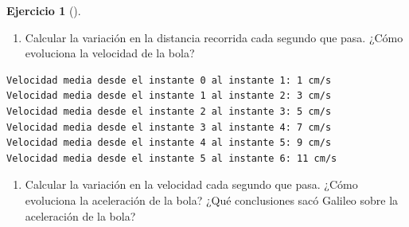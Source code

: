 \documentclass[
  a4paper,
]{scrreport}
\newenvironment{Shaded}{\begin{snugshade}}{\end{snugshade}}
\newcommand{\ControlFlowTok}[1]{\textcolor[rgb]{0.00,0.23,0.31}{#1}}
\newcommand{\FloatTok}[1]{\textcolor[rgb]{0.68,0.00,0.00}{#1}}
\newcommand{\FunctionTok}[1]{\textcolor[rgb]{0.28,0.35,0.67}{#1}}
\newcommand{\KeywordTok}[1]{\textcolor[rgb]{0.00,0.23,0.31}{#1}}
\newcommand{\NormalTok}[1]{\textcolor[rgb]{0.00,0.23,0.31}{#1}}
\newcommand{\OperatorTok}[1]{\textcolor[rgb]{0.37,0.37,0.37}{#1}}
\newcommand{\SpecialCharTok}[1]{\textcolor[rgb]{0.37,0.37,0.37}{#1}}
\newcommand{\StringTok}[1]{\textcolor[rgb]{0.13,0.47,0.30}{#1}}
\providecommand{\tightlist}{%
  \setlength{\itemsep}{0pt}\setlength{\parskip}{0pt}}\usepackage{longtable,booktabs,array}
\theoremstyle{definition}
\newtheorem{exercise}{Ejercicio}[chapter]
\theoremstyle{remark}
\begin{document}
\begin{exercise}[]
\begin{tcolorbox}
\end{tcolorbox}

\begin{enumerate}
\def\labelenumi{\alph{enumi}.}
\setcounter{enumi}{3}
\tightlist
\item
  Calcular la variación en la distancia recorrida cada segundo que pasa.
  ¿Cómo evoluciona la velocidad de la bola?
\end{enumerate}

\begin{tcolorbox}[enhanced jigsaw, colframe=quarto-callout-tip-color-frame, breakable, colback=white, coltitle=black, left=2mm, toptitle=1mm, colbacktitle=quarto-callout-tip-color!10!white, bottomtitle=1mm, opacityback=0, opacitybacktitle=0.6, title=\textcolor{quarto-callout-tip-color}{\faLightbulb}\hspace{0.5em}{Solución}, titlerule=0mm, toprule=.15mm, arc=.35mm, leftrule=.75mm, rightrule=.15mm, bottomrule=.15mm]

\begin{Shaded}
\end{Shaded}

\begin{verbatim}
Velocidad media desde el instante 0 al instante 1: 1 cm/s
Velocidad media desde el instante 1 al instante 2: 3 cm/s
Velocidad media desde el instante 2 al instante 3: 5 cm/s
Velocidad media desde el instante 3 al instante 4: 7 cm/s
Velocidad media desde el instante 4 al instante 5: 9 cm/s
Velocidad media desde el instante 5 al instante 6: 11 cm/s
\end{verbatim}

\end{tcolorbox}

\begin{enumerate}
\def\labelenumi{\alph{enumi}.}
\setcounter{enumi}{4}
\tightlist
\item
  Calcular la variación en la velocidad cada segundo que pasa. ¿Cómo
  evoluciona la aceleración de la bola? ¿Qué conclusiones sacó Galileo
  sobre la aceleración de la bola?
\end{enumerate}


\end{exercise}
\end{document}
